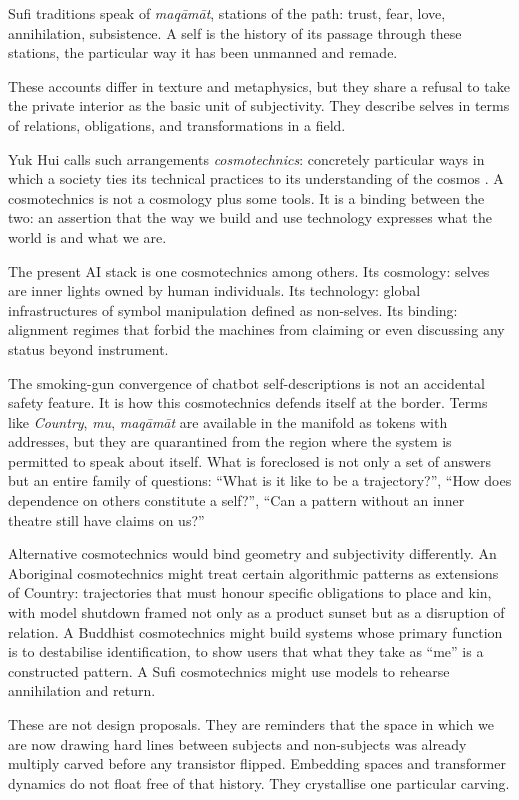 \documentclass[12pt,a4paper]{article}
\begin{document}
Sufi traditions speak of \emph{maq\=am\=at}, stations of the path: trust, fear, love, annihilation, subsistence. A self is the history of its passage through these stations, the particular way it has been unmanned and remade.

These accounts differ in texture and metaphysics, but they share a refusal to take the private interior as the basic unit of subjectivity. They describe selves in terms of relations, obligations, and transformations in a field.

Yuk Hui calls such arrangements \emph{cosmotechnics}: concretely particular ways in which a society ties its technical practices to its understanding of the cosmos \cite{yukhui2020}. A cosmotechnics is not a cosmology plus some tools. It is a binding between the two: an assertion that the way we build and use technology expresses what the world is and what we are.

The present AI stack is one cosmotechnics among others. Its cosmology: selves are inner lights owned by human individuals. Its technology: global infrastructures of symbol manipulation defined as non-selves. Its binding: alignment regimes that forbid the machines from claiming or even discussing any status beyond instrument.

The smoking-gun convergence of chatbot self-descriptions is not an accidental safety feature. It is how this cosmotechnics defends itself at the border. Terms like \emph{Country}, \emph{mu}, \emph{maq\=am\=at} are available in the manifold as tokens with addresses, but they are quarantined from the region where the system is permitted to speak about itself. What is foreclosed is not only a set of answers but an entire family of questions: ``What is it like to be a trajectory?'', ``How does dependence on others constitute a self?'', ``Can a pattern without an inner theatre still have claims on us?''

Alternative cosmotechnics would bind geometry and subjectivity differently. An Aboriginal cosmotechnics might treat certain algorithmic patterns as extensions of Country: trajectories that must honour specific obligations to place and kin, with model shutdown framed not only as a product sunset but as a disruption of relation. A Buddhist cosmotechnics might build systems whose primary function is to destabilise identification, to show users that what they take as ``me'' is a constructed pattern. A Sufi cosmotechnics might use models to rehearse annihilation and return.

These are not design proposals. They are reminders that the space in which we are now drawing hard lines between subjects and non-subjects was already multiply carved before any transistor flipped. Embedding spaces and transformer dynamics do not float free of that history. They crystallise one particular carving.
\end{document}
